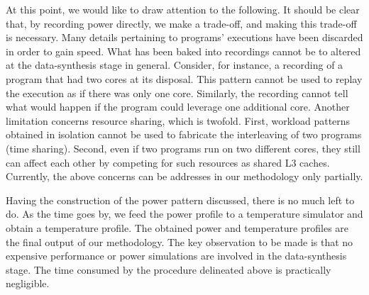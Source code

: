 At this point, we would like to draw attention to the following. It should be
clear that, by recording power directly, we make a trade-off, and making this
trade-off is necessary. Many details pertaining to programs' executions have
been discarded in order to gain speed. What has been baked into recordings
cannot be to altered at the data-synthesis stage in general. Consider, for
instance, a recording of a program that had two cores at its disposal. This
pattern cannot be used to replay the execution as if there was only one core.
Similarly, the recording cannot tell what would happen if the program could
leverage one additional core. Another limitation concerns resource sharing,
which is twofold. First, workload patterns obtained in isolation cannot be used
to fabricate the interleaving of two programs (time sharing). Second, even if
two programs run on two different cores, they still can affect each other by
competing for such resources as shared L3 caches. Currently, the above concerns
can be addresses in our methodology only partially.

Having the construction of the power pattern discussed, there is no much left to
do. As the time goes by, we feed the power profile to a temperature simulator
and obtain a temperature profile. The obtained power and temperature profiles
are the final output of our methodology. The key observation to be made is that
no expensive performance or power simulations are involved in the data-synthesis
stage. The time consumed by the procedure delineated above is practically
negligible.
